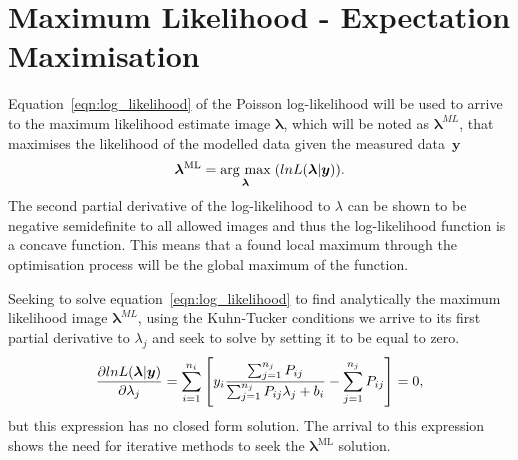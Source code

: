 \section{Maximum Likelihood - Expectation Maximisation}
\label{section:MLEM}
Equation~\ref{eqn:log_likelihood} of the Poisson log-likelihood will be used to arrive to the maximum likelihood estimate image $\bm\lambda$, which will be noted as $\bm{\lambda}^{ML}$, that maximises the likelihood of the modelled data given the measured \mbox{data $\bm{y}$}
\begin{equation}
\bm{\lambda}^{\textrm{ML}} = \underset{\bm{\lambda}}{\operatorname{arg}\,\operatorname{max}}\;(lnL(\bm{\lambda}|\bm{y})) \\ . \\
\end{equation}
The second partial derivative of the log-likelihood to $\lambda$ can be shown to be negative semidefinite to all allowed images and thus the log-likelihood function is a concave function. This means that a found local maximum through the optimisation process will be the global maximum of the function.

Seeking to solve equation~\ref{eqn:log_likelihood} to find analytically the maximum likelihood image $\bm{\lambda}^{ML}$, using the Kuhn-Tucker conditions we arrive to its first partial derivative to $\lambda_j$ and seek to solve by setting it to be equal to zero. 
\begin{equation}
\frac{\partial lnL(\bm{\lambda}|\bm{y})}{\partial \lambda_j} = \sum_{i=1}^{n_i}\left[  y_i \frac{\sum_{j=1}^{n_j} P_{ij} }{\sum_{j=1}^{n_j} P_{ij} \lambda_j + b_i} -\sum_{j=1}^{n_j} P_{ij}
\right]  = 0 \\,
\end{equation}
but this expression has no closed form solution.
The arrival to this expression shows the need for iterative methods to seek the $\bm{\lambda}^{\textrm{ML}}$ solution. 

